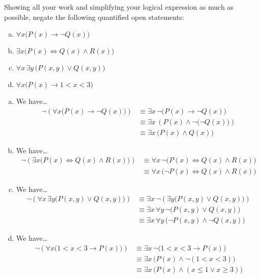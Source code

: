 \documentclass[11pt,letterpaper]{article}
\begin{document}
 Showing all your work and simplifying your logical expression as much as possible, negate the following quantified open statements:
	\begin{enumerate}[(a)]
	\item $\forall x \big( P(x) \to \neg Q(x) \big)$
	\item $\exists x \big( P(x) \Longleftrightarrow Q(x) \wedge R(x) \big)$
	\item $\forall x\, \exists y\, \big( P(x, y) \vee Q(x, y) \big)$
	\item $\forall x \big( P(x) \to 1 < x < 3 \big)$
	\end{enumerate} \pspace

\sol 
\begin{enumerate}[(a)]
\item We have\dots
	\[
	\begin{aligned}
	\neg \left( \forall x \big( P(x) \to \neg Q(x) \big) \right)&\equiv \exists x\, \neg \big( P(x) \to \neg Q(x) \big) \\[0.3cm]
	&\equiv \exists x\, \left( P(x) \wedge \neg \big(\neg Q(x) \big) \right) \\[0.3cm]
	&\equiv \exists x\, \big( P(x) \wedge Q(x) \big)
	\end{aligned}
	\] \pspace

\item We have\dots
	\[
	\begin{aligned}
	\neg \left( \exists x \big( P(x) \Longleftrightarrow Q(x) \wedge R(x) \big) \right)&\equiv \forall x\, \neg \big( P(x) \Longleftrightarrow Q(x) \wedge R(x) \big) \\[0.3cm]
	&\equiv \forall x\, \big( \neg P(x) \Longleftrightarrow Q(x) \wedge R(x) \big)
	\end{aligned}
	\] \pspace

\item We have\dots
	\[
	\begin{aligned}
	\neg \left( \forall x\, \exists y \big( P(x, y) \vee Q(x, y) \big) \right)&\equiv \exists x\, \neg \left( \exists y \big( P(x, y) \vee Q(x, y) \big) \right) \\[0.3cm]
	&\equiv \exists x\, \forall y\, \neg \big( P(x, y) \vee Q(x, y) \big) \\[0.3cm]
	&\equiv \exists x\, \forall y\, \big( \neg P(x, y) \wedge \neg Q(x, y) \big)
	\end{aligned}
	\] \pspace

\item We have\dots
	\[
	\begin{aligned}
	\neg \left( \forall x \big( 1 < x < 3 \to P(x) \big) \right)&\equiv \exists x\, \neg \big( 1 < x < 3 \to P(x) \big) \\[0.3cm]
	&\equiv \exists x\, \big( P(x) \wedge \neg (1 < x < 3) \big) \\[0.3cm]
	&\equiv \exists x\, \big( P(x) \wedge (x \leq 1 \vee x \geq 3) \big)
	\end{aligned}
	\]
\end{enumerate}
\end{document}
